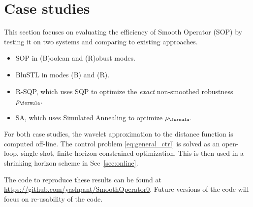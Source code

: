 \section{Case studies}
\label{sec:case study}

This section focuses on evaluating the efficiency of Smooth Operator (SOP) by testing it on two systems and comparing to existing approaches.

\begin{itemize}
	\vspace{-1pt}
	\item SOP in (B)oolean and (R)obust modes.
	\vspace{-1pt}
	\item BluSTL in modes (B) and (R).
	\item R-SQP, which uses SQP to optimize the \textit{exact} non-smoothed robustness $\robf$.
	\vspace{-1pt}
	\item SA, which uses Simulated Annealing to optimize $\robf$.%
	\vspace{-1pt}
\end{itemize}

For both case studies, the wavelet approximation to the distance function is computed off-line. 
The control problem \eqref{eq:general_ctrl} is solved as an open-loop, single-shot, finite-horizon constrained optimization.
This is then used in a shrinking horizon scheme in Sec~\ref{sec:online}.

The code to reproduce these results can be found at \protect\url{https://github.com/yashpant/SmoothOperator0}. Future versions of the code will focus on re-usability of the code. %



